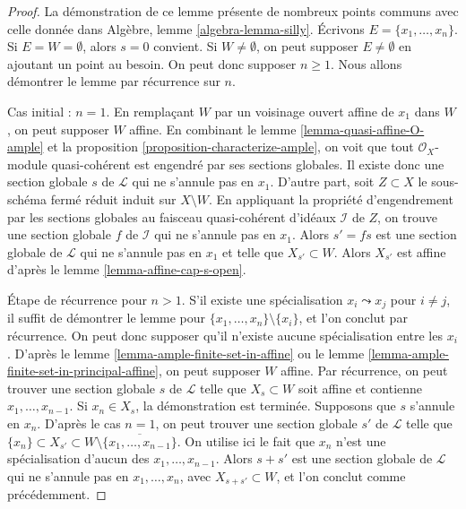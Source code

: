 \begin{proof}
La démonstration de ce lemme présente de nombreux points communs avec celle donnée
dans Algèbre, lemme \ref{algebra-lemma-silly}.
Écrivons $E = \{x_1, \ldots, x_n\}$. Si $E = W = \emptyset$, alors $s = 0$
convient. Si $W \not = \emptyset$, on peut supposer $E \not = \emptyset$
en ajoutant un point au besoin. On peut donc supposer $n \geq 1$.
Nous allons démontrer le lemme par récurrence sur $n$.

\medskip\noindent
Cas initial : $n = 1$. En remplaçant $W$ par un voisinage ouvert affine
de $x_1$ dans $W$, on peut supposer $W$ affine. En combinant
le lemme \ref{lemma-quasi-affine-O-ample} et
la proposition \ref{proposition-characterize-ample},
on voit que tout
$\mathcal{O}_X$-module quasi-cohérent est engendré par ses
sections globales. Il existe
donc une section globale $s$ de $\mathcal{L}$ qui ne s'annule pas en $x_1$.
D'autre part, soit $Z \subset X$ le
sous-schéma fermé réduit induit sur $X \setminus W$.
En appliquant la propriété d'engendrement par les sections globales au faisceau quasi-cohérent d'idéaux
$\mathcal{I}$ de $Z$, on trouve une section globale $f$ de $\mathcal{I}$
qui ne s'annule pas en $x_1$. Alors $s' = fs$ est une section globale
de $\mathcal{L}$ qui ne s'annule pas en $x_1$ et telle que
$X_{s'} \subset W$. Alors $X_{s'}$ est affine d'après
le lemme \ref{lemma-affine-cap-s-open}.

\medskip\noindent
Étape de récurrence pour $n > 1$. S'il existe une spécialisation
$x_i \leadsto x_j$ pour $i \not = j$, il suffit de
démontrer le lemme pour $\{x_1, \ldots, x_n\} \setminus \{x_i\}$,
et l'on conclut par récurrence. On peut donc supposer qu'il n'existe
aucune spécialisation entre les $x_i$.
D'après le lemme \ref{lemma-ample-finite-set-in-affine} ou
le lemme \ref{lemma-ample-finite-set-in-principal-affine},
on peut supposer $W$ affine. Par
récurrence, on peut trouver une section globale
$s$ de $\mathcal{L}$ telle que $X_s \subset W$ soit affine et contienne
$x_1, \ldots, x_{n - 1}$. Si $x_n \in X_s$, la démonstration est terminée.
Supposons que $s$ s'annule en $x_n$. D'après le cas $n = 1$, on peut
trouver une section globale $s'$ de $\mathcal{L}$ telle que
$\{x_n\} \subset X_{s'} \subset
W \setminus \overline{\{x_1, \ldots, x_{n - 1}\}}$.
On utilise ici le fait que $x_n$ n'est une spécialisation d'aucun des $x_1, \ldots, x_{n - 1}$.
Alors $s + s'$
est une section globale de $\mathcal{L}$ qui ne s'annule pas
en $x_1, \ldots, x_n$, avec $X_{s + s'} \subset W$, et
l'on conclut comme précédemment.
\end{proof}

